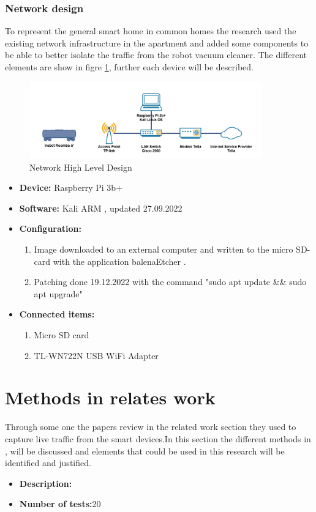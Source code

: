 \subsubsection{Network design}
To represent the general smart home in common homes the research used the existing network infrastructure in the apartment and added some components to be able to better isolate the traffic from the robot vacuum cleaner. The different elements are show in figre \ref{fig:HLD}, further each device will be described. 

\begin{figure}[!ht]
    \centering
    \includegraphics[width=10cm]{figures/HLD.png}
    \caption{Network High Level Design}
    \label{fig:HLD}
\end{figure}

\begin{itemize}
    \item \textbf{Device:} Raspberry Pi 3b+
    \item \textbf{Software:} Kali ARM \cite{kalidownload}, updated 27.09.2022
    \item \textbf{Configuration:}
    \begin{enumerate}
        \item Image downloaded to an external computer and written to the micro SD-card with the application balenaEtcher \cite{balenaetcherdownload}.
        \item Patching done 19.12.2022 with the command "sudo apt update \&\& sudo apt upgrade"
    \end{enumerate}
    \item \textbf{Connected items:}
    \begin{enumerate}
        \item Micro SD card \cite{microsdcard}
        \item TL-WN722N USB WiFi Adapter \cite{tp-link}
    \end{enumerate}
\end{itemize}





\section{Methods in relates work}
Through some one the papers review in the related work section they used to capture live traffic from the smart devices.In this section the different methods in \cite{lindaeavesdropping} \cite{eavsIoT} \cite{Neato}, will be discussed and elements that could be used in this research will be identified and justified. 


\begin{itemize}
    \item \textbf{Description:}
    \item \textbf{Number of tests:}20
\end{itemize}